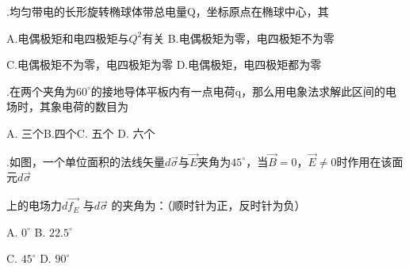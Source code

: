 \vspace{0.2cm}

.\hspace{0.8em}均匀带电的长形旋转椭球体带总电量Q，坐标原点在椭球中心，其
\vspace{0.2cm}

A.\hspace{0.8em}电偶极矩和电四极矩与$Q^2$有关 \hspace{2em} B.\hspace{0.8em}电偶极矩为零，电四极矩不为零
\vspace{0.2cm}

C.\hspace{0.8em}电偶极矩不为零，电四极矩为零\hspace{2.1em} D.\hspace{0.8em}电偶极矩，电四极矩都为零
\vspace{0.2cm}

.\hspace{0.8em}在两个夹角为$60^{\circ}$的接地导体平板内有一点电荷q，那么用电象法求解此区间的电场时，其象电荷的数目为
\vspace{0.2cm}

A.\hspace{0.8em} 三个\hspace{5em}B.\hspace{0.8em}四个\hspace{5em}C.\hspace{0.8em} 五个 \hspace{5em}D.\hspace{0.8em} 六个
\vspace{0.2cm}

.\hspace{0.8em}如图，一个单位面积的法线矢量$d \Vec{\sigma}$与$\Vec{E}$夹角为$45^{\circ}$，当$\Vec{B} = 0$，$\Vec{E} \neq 0$时作用在该面元$d \Vec{\sigma}$ \vspace{0.1cm}

\noindent
上的电场力$d \Vec{f_{E}}$ 与$d \Vec{\sigma}$ 的夹角为：（顺时针为正，反时针为负）



\vspace{0.5cm}

A.\hspace{0.8em} $0^{\circ}$\hspace{8em}  B.\hspace{0.8em} $22.5^{\circ}$
\vspace{0.3cm}

C.\hspace{0.8em} $45^{\circ}$\hspace{7.5em}  D.\hspace{0.8em} $90^{\circ}$ 

